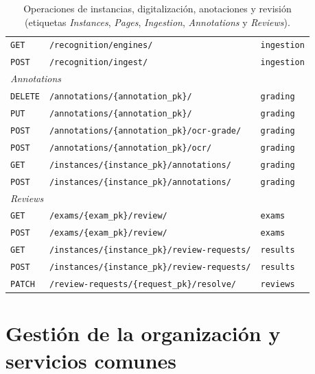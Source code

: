 \begin{table}[htbp]
\begin{tabular}{llp{3.6cm}}
    \texttt{GET} & \texttt{/recognition/engines/} & \texttt{ingestion} \\
    \texttt{POST} & \texttt{/recognition/ingest/} & \texttt{ingestion} \\
    \midrule
    \multicolumn{3}{l}{\textit{Annotations}} \\
    \texttt{DELETE} & \texttt{/annotations/\{annotation\_pk\}/} & \texttt{grading} \\
    \texttt{PUT} & \texttt{/annotations/\{annotation\_pk\}/} & \texttt{grading} \\
    \texttt{POST} & \texttt{/annotations/\{annotation\_pk\}/ocr-grade/} & \texttt{grading} \\
    \texttt{POST} & \texttt{/annotations/\{annotation\_pk\}/ocr/} & \texttt{grading} \\
    \texttt{GET} & \texttt{/instances/\{instance\_pk\}/annotations/} & \texttt{grading} \\
    \texttt{POST} & \texttt{/instances/\{instance\_pk\}/annotations/} & \texttt{grading} \\
    \midrule
    \multicolumn{3}{l}{\textit{Reviews}} \\
    \texttt{GET} & \texttt{/exams/\{exam\_pk\}/review/} & \texttt{exams} \\
    \texttt{POST} & \texttt{/exams/\{exam\_pk\}/review/} & \texttt{exams} \\
    \texttt{GET} & \texttt{/instances/\{instance\_pk\}/review-requests/} & \texttt{results} \\
    \texttt{POST} & \texttt{/instances/\{instance\_pk\}/review-requests/} & \texttt{results} \\
    \texttt{PATCH} & \texttt{/review-requests/\{request\_pk\}/resolve/} & \texttt{reviews} \\
    \bottomrule
  \end{tabular}
  \caption{Operaciones de instancias, digitalización, anotaciones y revisión
    (etiquetas \textit{Instances}, \textit{Pages}, \textit{Ingestion},
    \textit{Annotations} y \textit{Reviews}).\label{TAB:API-INSTANCES}}
\end{table}

\section*{Gestión de la organización y servicios comunes}

